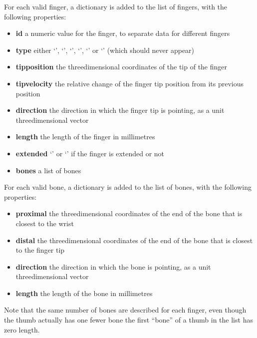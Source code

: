 For each valid finger, a dictionary is added to the list of fingers, with the following
properties:
\begin{itemize}
\item\textbf{id} \longDash{} a numeric value for the finger, to separate data for
different fingers
\item\exSp\textbf{type} \longDash{} either `', `',
`', `', `' or `' (which should
never appear)
\item\exSp\textbf{tipposition} \longDash{} the three\longDash{}dimensional coordinates of
the tip of the finger
\item\exSp\textbf{tipvelocity} \longDash{} the relative change of the finger tip position
from its previous position
\item\exSp\textbf{direction} \longDash{} the direction in which the finger tip is
pointing, as a unit three\longDash{}dimensional vector
\item\exSp\textbf{length} \longDash{} the length of the finger in millimetres
\item\exSp\textbf{extended} \longDash{} `' or `' if the finger is
extended or not
\item\exSp\textbf{bones} \longDash{} a list of bones
\end{itemize}

For each valid bone, a dictionary is added to the list of bones, with the following
properties:
\begin{itemize}
\item\textbf{proximal} \longDash{} the three\longDash{}dimensional coordinates of the end
of the bone that is closest to the wrist
\item\exSp\textbf{distal} \longDash{} the three\longDash{}dimensional coordinates of the
end of the bone that is closest to the finger tip
\item\exSp\textbf{direction} \longDash{} the direction in which the bone is pointing, as a
unit three\longDash{}dimensional vector
\item\exSp\textbf{length} \longDash{} the length of the bone in millimetres
\end{itemize}
Note that the same number of bones are described for each finger, even though the thumb
actually has one fewer bone \longDash{} the first ``bone'' of a thumb in the list has zero
length.\\

